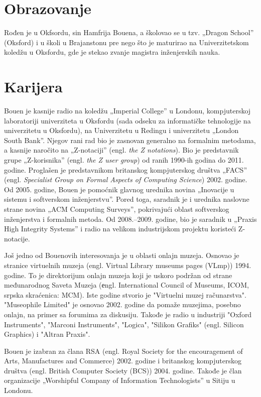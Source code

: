 \documentclass[a4paper]{article}
\begin{document}
\section{Obrazovanje}
Rođen je u Okfsordu, sin Hamfrija Bouena,\cite{annss} a školovao se u tzv. „Dragon School” (Oksford) i u školi u Brajanstonu pre nego što je maturirao na Univerzitetskom koledžu u Oksfordu, gde je stekao zvanje magistra inženjerskih nauka. 
\section{Karijera}
Bouen je kasnije radio na koledžu „Imperial College” u Londonu, kompjuterskoj laboratoriji univerziteta u Oksfordu (sada odseku za informatičke tehnologije na univerzitetu u Oksfordu), na Univerzitetu u Redingu i univerzitetu „London South Bank”. Njegov rani rad bio je zasnovan generalno na formalnim metodama, a kasnije naročito na „Z-notaciji” (engl. \textit{the Z notations}). Bio je predstavnik grupe „Z-korisnika” (engl. \textit{the Z user group}) od ranih 1990-ih godina do 2011. godine. Proglašen je predstavnikom britanskog kompjuterskog društva „FACS” (engl. \textit{Specialist Group on Formal Aspects of Computing Science}) 2002. godine.\cite{bcs} Od 2005. godine, Bouen je pomoćnik glavnog urednika novina „Inovacije u sistemu i softverskom inženjerstvu”.\cite{editorial} Pored toga, saradnik je i urednika naslovne strane novina „ACM Computing Surveys”, pokrivajući oblast softverskog inženjerstva i formalnih metoda.\cite{editorial2} Od 2008.–2009. godine, bio je saradnik u „Praxis High Integrity Systems” i radio na velikom industrijskom projektu koristeći Z-notacije.

Još jedno od Bouenovih interesovanja je u oblasti onlajn muzeja. Osnovao je stranice virtuelnih muzeja (engl. Virtual Library museums pages (VLmp)) 1994. godine. To je direktorijum onlajn muzeja koji je uskoro podržan od strane međunarodnog Saveta Muzeja (еngl. International Council of Museums, ICOM, srpska skraćenica: MCM).\cite{vlm} Iste godine stvorio je "Virtuelni muzej računarstva". 
"Museophile Limited"\cite{museophile} je osnovao 2002. godine da pomaže muzejima, posebno onlajn, na primer sa forumima za diskusiju.\cite{jonp} Takođe je radio u industriji "Oxford Instruments", "Marconi Instruments", "Logica", "Silikon Grafiks" (engl. Silicon Graphics) i "Altran Praxis".

Bouen je izabran za člana RSA (engl. Royal Society for the encouragement of Arts, Manufactures and Commerce) 2002. godine i britanskog kompjuterskog društva (engl. British Computer Society (BCS)) 2004. godine. Takođe je član organizacije „Worshipful Company of Information Technologists” u Sitiju u Londonu.
\end{document}
